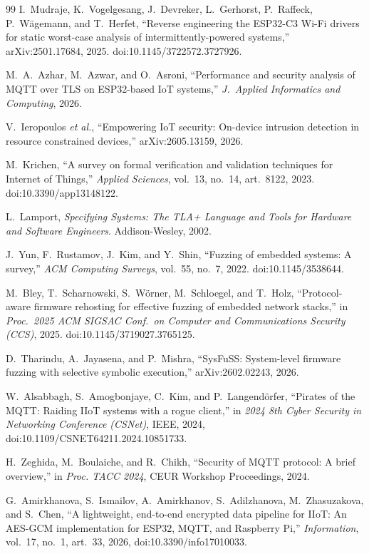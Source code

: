 \begin{thebibliography}{99}
 I.~Mudraje, K.~Vogelgesang, J.~Devreker, L.~Gerhorst, P.~Raffeck,
P.~W\"agemann, and T.~Herfet, ``Reverse engineering the ESP32-C3 Wi-Fi drivers for static
worst-case analysis of intermittently-powered systems,'' arXiv:2501.17684, 2025.
doi:10.1145/3722572.3727926.

 M.~A.~Azhar, M.~Azwar, and O.~Asroni, ``Performance and security analysis
of MQTT over TLS on ESP32-based IoT systems,'' \emph{J.\ Applied Informatics and Computing},
2026.

 V.~Ieropoulos \emph{et al.}, ``Empowering IoT security: On-device
intrusion detection in resource constrained devices,'' arXiv:2605.13159, 2026.

 M.~Krichen, ``A survey on formal verification and validation techniques for
Internet of Things,'' \emph{Applied Sciences}, vol.~13, no.~14, art.~8122, 2023.
doi:10.3390/app13148122.

 L.~Lamport, \emph{Specifying Systems: The TLA+ Language and Tools for
Hardware and Software Engineers}. Addison-Wesley, 2002.

 J.~Yun, F.~Rustamov, J.~Kim, and Y.~Shin, ``Fuzzing of embedded
systems: A survey,'' \emph{ACM Computing Surveys}, vol.~55, no.~7, 2022.
doi:10.1145/3538644.

 M.~Bley, T.~Scharnowski, S.~W\"orner, M.~Schloegel, and T.~Holz,
``Protocol-aware firmware rehosting for effective fuzzing of embedded network stacks,'' in
\emph{Proc.\ 2025 ACM SIGSAC Conf.\ on Computer and Communications Security (CCS)}, 2025.
doi:10.1145/3719027.3765125.

 D.~Tharindu, A.~Jayasena, and P.~Mishra, ``SysFuSS: System-level firmware
fuzzing with selective symbolic execution,'' arXiv:2602.02243, 2026.

 W.~Alsabbagh, S.~Amogbonjaye, C.~Kim, and P.~Langend\"orfer, ``Pirates of
the MQTT: Raiding IIoT systems with a rogue client,'' in \emph{2024 8th Cyber Security in
Networking Conference (CSNet)}, IEEE, 2024, doi:10.1109/CSNET64211.2024.10851733.

 H.~Zeghida, M.~Boulaiche, and R.~Chikh, ``Security of MQTT protocol: A
brief overview,'' in \emph{Proc. TACC 2024}, CEUR Workshop Proceedings, 2024.

 G.~Amirkhanova, S.~Ismailov, A.~Amirkhanov, S.~Adilzhanova,
M.~Zhasuzakova, and S.~Chen, ``A lightweight, end-to-end encrypted data pipeline for IIoT: An
AES-GCM implementation for ESP32, MQTT, and Raspberry Pi,'' \emph{Information}, vol.~17, no.~1,
art.~33, 2026, doi:10.3390/info17010033.


\end{thebibliography}
